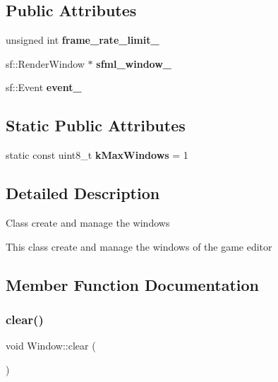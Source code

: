 \subsection*{Public Attributes}
\begin{DoxyCompactItemize}
\item 
\mbox{\label{class_window_adf4fd93b0ad5bd9c045a4bbc5c767b7d}} 
unsigned int {\bfseries frame\+\_\+rate\+\_\+limit\+\_\+}
\item 
\mbox{\label{class_window_a49d4bbd674a3cef9ff823ef17a0bef42}} 
sf\+::\+Render\+Window $\ast$ {\bfseries sfml\+\_\+window\+\_\+}
\item 
\mbox{\label{class_window_a79a1f398d58121ef49bb7d29b3f2ea64}} 
sf\+::\+Event {\bfseries event\+\_\+}
\end{DoxyCompactItemize}
\subsection*{Static Public Attributes}
\begin{DoxyCompactItemize}
\item 
\mbox{\label{class_window_adddb1eb449be45c372249dc1462c4e68}} 
static const uint8\+\_\+t {\bfseries k\+Max\+Windows} = 1
\end{DoxyCompactItemize}


\subsection{Detailed Description}
Class create and manage the windows

This class create and manage the windows of the game editor 

\subsection{Member Function Documentation}
\mbox{\label{class_window_a38bc43bdd1a97e5de7f346ba4c3957ef}} 
\subsubsection{\texorpdfstring{clear()}{clear()}}
{\footnotesize\ttfamily void Window\+::clear (\begin{DoxyParamCaption}{ }\end{DoxyParamCaption})}




